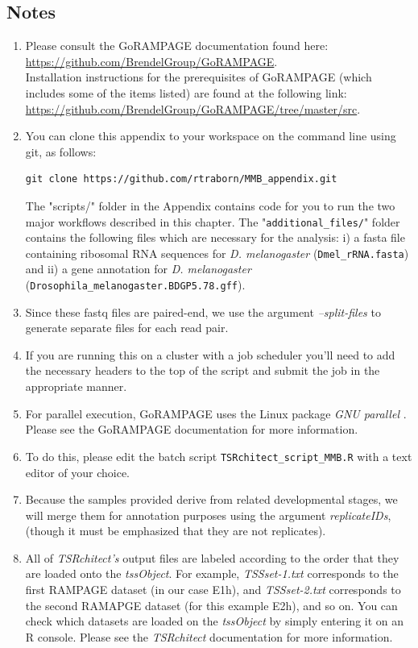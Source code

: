\documentclass[runningheads,a4paper]{llncs}
\begin{document}
\begin{linenumbers}
\section{Notes}
\begin{enumerate}
\item Please consult the GoRAMPAGE documentation found here:\\
 \url{https://github.com/BrendelGroup/GoRAMPAGE}.\\
Installation instructions for the prerequisites of GoRAMPAGE (which includes some of the items listed) are found at the following link:\\
 \url{https://github.com/BrendelGroup/GoRAMPAGE/tree/master/src}.
\item You can clone this appendix to your workspace on the command line using git, as follows:
\begin{verbatim}
git clone https://github.com/rtraborn/MMB_appendix.git
\end{verbatim}
The "scripts/" folder in the Appendix contains code for you to run the two major workflows described in this chapter.
The "\texttt{additional\_files/}" folder contains the following files which are necessary for the analysis: i) a fasta file containing ribosomal RNA sequences for \textit{D. melanogaster} (\texttt{Dmel\_rRNA.fasta}) and ii) a gene annotation for \textit{D. melanogaster} (\texttt{Drosophila\_melanogaster.BDGP5.78.gff}).
\item Since these fastq files are paired-end, we use the argument \textit{--split-files} to generate separate files for each read pair.
\item If you are running this on a cluster with a job scheduler you'll need to add the necessary headers to the top of the script and submit the job in the appropriate manner.
\item For parallel execution, GoRAMPAGE uses the Linux package \textit{GNU parallel} \cite{Tange2011a}. 
Please see the GoRAMPAGE documentation for more information.
\item To do this, please edit the batch script \texttt{TSRchitect\_script\_MMB.R} with a text editor of your choice.
\item Because the samples provided derive from related developmental stages, we will merge them for annotation purposes using the argument \textit{replicateIDs}, (though it must be emphasized that they are not replicates).
\item All of \textit{TSRchitect's} output files are labeled according to the order that they are loaded onto the \textit{tssObject}. 
For example, \textit{TSSset-1.txt} corresponds to the first RAMPAGE dataset (in our case E1h), and \textit{TSSset-2.txt} corresponds to the second RAMAPGE dataset (for this example E2h), and so on.
You can check which datasets are loaded on the \textit{tssObject} by simply entering it on an R console. 
Please see the \textit{TSRchitect} documentation for more information.


\end{enumerate}
\end{linenumbers}
\end{document}
